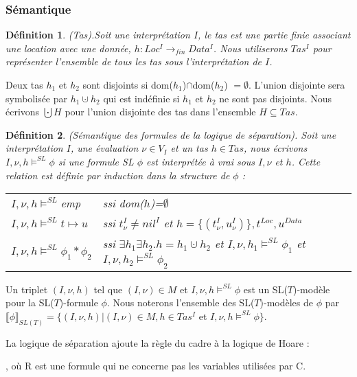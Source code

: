 \documentclass[11pt,openany]{article}
\newcommand\phibra{\llbracket\phi\rrbracket}
\newtheorem{definition}{D\'efinition}[subsection]
\begin{document}
		\subsubsection{S\'emantique}
	\begin{definition}
	(Tas).Soit une interpr\'etation $I$, le tas est une partie finie associant une location avec une donn\'ee, $h : Loc^{I} \rightarrow_{fin} Data^{I}$. Nous utiliserons $Tas^{I}$ pour repr\'esenter l'ensemble de tous les tas sous l'interpr\'etation de $I$.
	\end{definition}
	Deux tas $h_{1}$ et $h_{2}$ sont disjoints si dom($h_{1}$)$\cap$dom($h_{2}$) $= \emptyset$. L'union disjointe sera symbolis\'ee par $h_{1}\cupdot h_{2}$ qui est ind\'efinie si $h_{1}$ et $h_{2}$ ne sont pas disjoints. Nous \'ecrivons $\bigcupdot H$ pour l'union disjointe des tas dans l'ensemble $H \subseteq Tas$.
	\begin{definition}
	(S\'emantique des formules de la logique de s\'eparation). Soit une interpr\'etation $I$, une \'evaluation $\nu\in V_{I}$ et un tas $h\in Tas$, nous \'ecrivons $I,\nu,h\models^{SL}\phi$ si une formule SL $\phi$ est interpr\'et\'ee \`a vrai sous $I,\nu$ et $h$. Cette relation est d\'efinie par induction  dans la structure de $\phi$ :
	
\begin{tabular}{ll}
$I,\nu,h\models^{SL}$emp & ssi dom($h$)=$\emptyset$\\
$I,\nu,h\models^{SL}t\mapsto u$ & ssi $t^{I}_{\nu}\neq nil^{I}$ et $h = \{(t^{I}_{\nu},u^{I}_{\nu} )\}, t^{Loc}, u^{Data}$\\
$I,\nu,h\models^{SL}\phi_{1}*\phi_{2}$ & ssi $\exists h_{1}\exists h_{2}.h=h_{1}\cupdot h_{2}$ et $I,\nu,h_{1}\models^{SL}\phi_{1}$ et $I,\nu,h_{2}\models^{SL}\phi_{2}$
\end{tabular}

	\end{definition}
	Un triplet $(I,\nu,h)$ tel que $(I,\nu)\in M$ et $I,\nu,h\models^{SL}\phi$ est un SL($T$)-mod\`ele pour la SL($T$)-formule $\phi$. Nous noterons l'ensemble des SL($T$)-mod\`eles de $\phi$ par $\phibra_{SL(T)} = \{(I,\nu,h)|(I,\nu)\in M,h\in Tas^{I}$ et $I,\nu,h\models^{SL}\phi\}$.

La logique de s\'eparation ajoute la r\`egle du cadre \`a la logique de Hoare :
		\begin{center}
		


		\end{center}
, o\`u R est une formule qui ne concerne pas les variables utilis\'ees par C.
\end{document}
